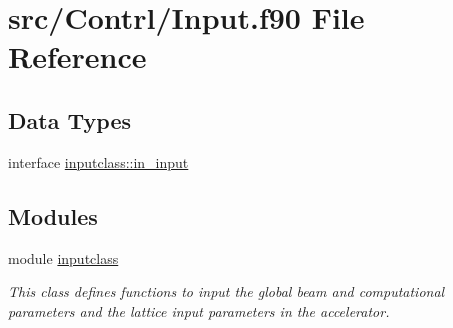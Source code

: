 \hypertarget{_input_8f90}{}\section{src/\+Contrl/\+Input.f90 File Reference}
\label{_input_8f90}
\subsection*{Data Types}
\begin{DoxyCompactItemize}
\item 
interface \mbox{\hyperlink{interfaceinputclass_1_1in__input}{inputclass\+::in\+\_\+input}}
\end{DoxyCompactItemize}
\subsection*{Modules}
\begin{DoxyCompactItemize}
\item 
module \mbox{\hyperlink{namespaceinputclass}{inputclass}}
\begin{DoxyCompactList}\small\item\em This class defines functions to input the global beam and computational parameters and the lattice input parameters in the accelerator. \end{DoxyCompactList}\end{DoxyCompactItemize}
